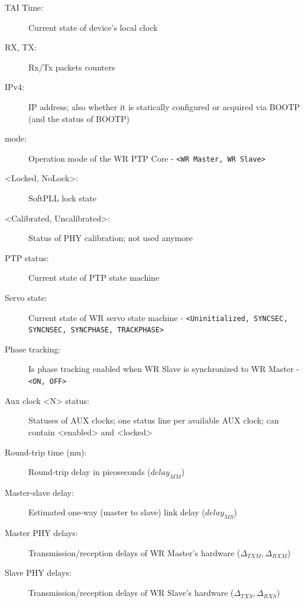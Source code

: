 \documentclass[a4paper, 12pt]{article}
\renewcommand{\_}{\underscore\allowbreak}
\newcommand{\code}[1]{\texttt{#1}}
\begin{document}
\renewcommand{\descriptionlabel}[1]{\texttt{#1}}

\begin{description}

\item[TAI Time:] Current state of device's local clock

\item[RX, TX:] Rx/Tx packets counters

\item[IPv4:] IP address; also whether it is statically configured or
    acquired via BOOTP (and the status of BOOTP)

\item[mode:] Operation mode of the WR PTP Core - \code{<WR Master,
    WR Slave>}

\item[<Locked, NoLock>:] SoftPLL lock state

\item[<Calibrated, Uncalibrated>:] Status of PHY calibration; not used
    anymore

\item[PTP status:] Current state of PTP state machine

\item[Servo state:] Current state of WR servo state machine -
    \code{<Uninitialized, SYNC\_SEC, SYNC\_NSEC, SYNC\_PHASE, TRACK\_PHASE>}

\item[Phase tracking:] Is phase tracking enabled when WR Slave is
    synchronized to WR Master - \code{<ON, OFF>}

\item[Aux clock <N> status:] Statuses of AUX clocks; one status line per
    available AUX clock; can contain <enabled> and <locked>


\item[Round-trip time (mu):] Round-trip delay in picoseconds ($delay_{MM}$)

\item[Master-slave delay:] Estimated one-way (master to slave) link
    delay ($delay_{MS}$)

\item[Master PHY delays:] Transmission/reception delays of WR
    Master's hardware ($\Delta_{TXM}, \Delta_{RXM}$)

\item[Slave PHY delays:] Transmission/reception delays of WR Slave's
    hardware ($\Delta_{TXS}, \Delta_{RXS}$)


\end{description}
\end{document}
